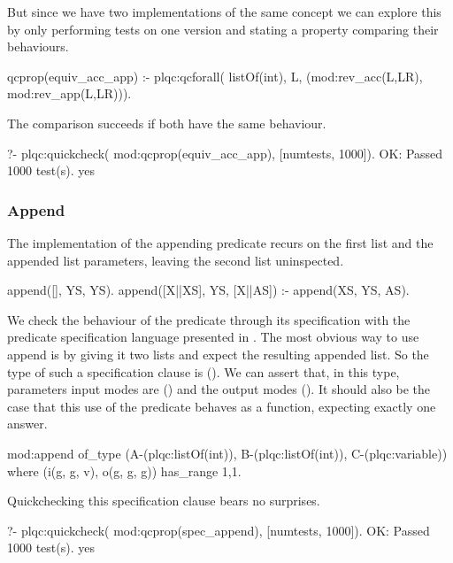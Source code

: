 But since we have two implementations of the same concept we can explore
this by only performing tests on one version and stating a property
comparing their behaviours.
%
\begin{yapcode}
 qcprop(equiv_acc_app) :-
   plqc:qcforall( listOf(int), L,
     (mod:rev_acc(L,LR), mod:rev_app(L,LR))).
\end{yapcode}
The comparison succeeds if both have the same behaviour.
%
\begin{yapcode}
   ?- plqc:quickcheck(
        mod:qcprop(equiv_acc_app),
        [{numtests, 1000}]).
 OK: Passed 1000 test(s).
 yes
\end{yapcode}



\subsubsection{Append}
The implementation of the appending predicate recurs on the first list
and the appended list parameters, leaving the second list uninspected.
%
\begin{yapcode}
 append([], YS, YS).
 append([X||XS], YS, [X||AS]) :-
   append(XS, YS, AS).
\end{yapcode}
%
We check the behaviour of the  predicate
through its specification with the predicate specification language
presented in .
%
The most obvious way to use append is by giving it two lists and expect
the resulting appended list.
%
So the type of such a specification clause is
().
%
We can assert that, in this \plqc{} type, parameters input modes are
() and the output modes ().
%
It should also be the case that this use of the predicate behaves as a
function, expecting exactly one answer.
%
\begin{yapcode}
 mod:append
   of_type (A-(plqc:listOf(int)),
     B-(plqc:listOf(int)), C-(plqc:variable))
   where (i(g, g, v), o(g, g, g))
   has_range {1,1}.
\end{yapcode}
%
Quickchecking this specification clause bears no surprises.
%
\begin{yapcode}
   ?- plqc:quickcheck(
        mod:qcprop(spec_append),
        [{numtests, 1000}]).
 OK: Passed 1000 test(s).
 yes
\end{yapcode}


